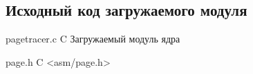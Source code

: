 \begin{appendices}
	\chapter{Исходный код загружаемого модуля}
    {pagetracer.c}
    {C}
    {Загружаемый модуль ядра}

    \newpage
    {page.h}
    {C}
    {<asm/page.h>}
\end{appendices}